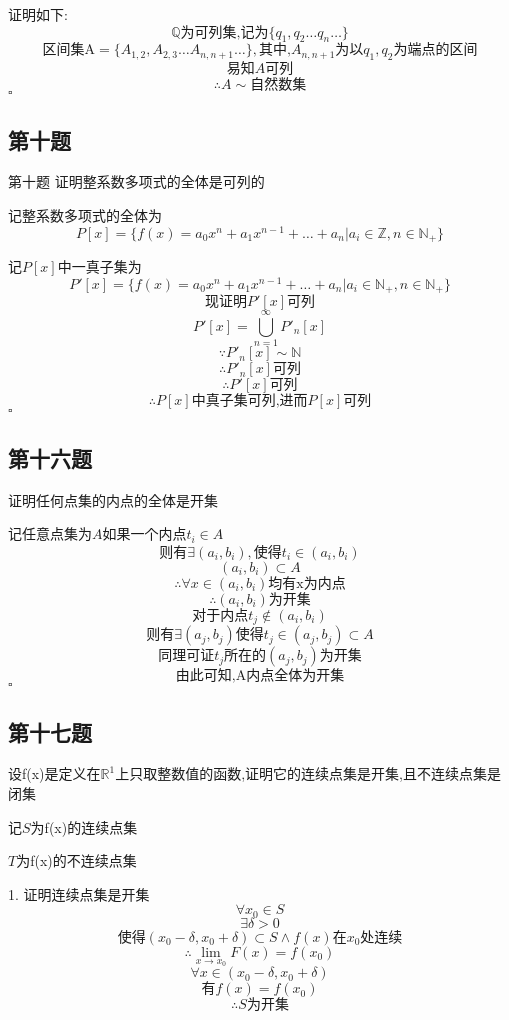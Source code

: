\documentclass[a4paper]{article}
\begin{document}
    证明如下:
    \[\mathbb{Q}\text{为可列集,记为} \{q_1,q_2\ldots q_n \ldots\}\]
    \[\text{区间集A}=\{A_{1,2},A_{2,3}\ldots A_{n,n+1} \ldots\},\text{其中,}A_{n,n+1}\text{为以}q_1,q_2\text{为端点的区间}\]
    \[\text{易知}A可列\]
    \[\therefore A \sim \text{自然数集}\]
    \hfill $\square$

    \subsection{第十题}
    第十题 证明整系数多项式的全体是可列的

    记整系数多项式的全体为
    \[P[x]=\{f(x)=a_0x^n+a_1x^{n-1}+\ldots+a_n|a_i \in \mathbb{Z},n\in \mathbb{N_+}\}\]
    
    记$P[x]$中一真子集为
    \[P'[x]=\{f(x)=a_0x^n+a_1x^{n-1}+\ldots+a_n|a_i \in \mathbb{N_+},n\in \mathbb{N_+}\}\]
    \[\text{现证明}P'[x]\text{可列}\]
    \[P'[x] = \bigcup_{n=1}^{\infty} P'_n[x]\]
    \[\because  P'_n[x]\sim \mathbb{N}\]
    \[\therefore P'_n[x]\text{可列}\]
    \[\therefore P'[x]\text{可列}\]
    \[\therefore P[x]\text{中真子集可列,进而}P[x]\text{可列}\]
    \hfill $\square$

    \subsection{第十六题}
    证明任何点集的内点的全体是开集

    记任意点集为$A$如果一个内点$t_i \in A$
    \[\text{则有}\exists (a_i,b_i),\text{使得}t_i \in (a_i,b_i)\]
    \[(a_i,b_i) \subset A\]
    \[\therefore \forall x \in (a_i,b_i)\text{均有x为内点}\]
    \[\therefore (a_i,b_i)\text{为开集}\]
    \[\text{对于内点}t_j\not\in (a_i,b_i)\]
    \[\text{则有}\exists (a_j,b_j)\text{使得}t_j \in (a_j,b_j) \subset A\]
    \[\text{同理可证}t_j\text{所在的}(a_j,b_j)\text{为开集}\]
    \[\text{由此可知,A内点全体为开集}\]
    \hfill $\square$

    \subsection{第十七题}
    设f(x)是定义在$\mathbb{R}^1$上只取整数值的函数,证明它的连续点集是开集,且不连续点集是闭集

    记$S$为f(x)的连续点集
    
    $T$为f(x)的不连续点集

    1. 证明连续点集是开集
    \[\forall x_0 \in S\]
    \[\exists \delta >0\]
    \[\text{使得}(x_0-\delta,x_0+\delta)\subset S\land f(x)\text{在}x_0\text{处连续}\]
    \[\therefore \lim_{x\to x_0}F(x)=f(x_0)\]
    \[\forall x \in (x_0-\delta,x_0+\delta)\]
    \[\text{有}f(x)=f(x_0)\]
    \[\therefore S\text{为开集}\]
\end{document}
